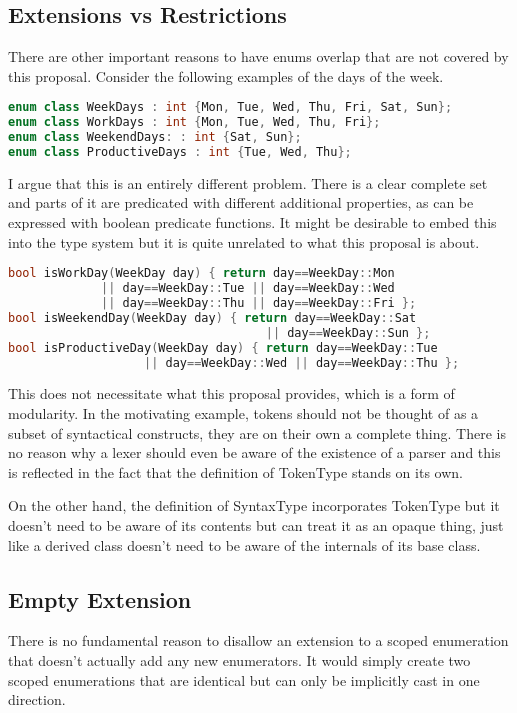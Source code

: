 \documentclass{scrartcl}
\begin{document}
\subsection{Extensions vs Restrictions}
There are other important reasons to have enums overlap that are not covered by this proposal.
Consider the following examples of the days of the week.

\begin{lstlisting}[language=C++]
enum class WeekDays : int {Mon, Tue, Wed, Thu, Fri, Sat, Sun};
enum class WorkDays : int {Mon, Tue, Wed, Thu, Fri};
enum class WeekendDays: : int {Sat, Sun};
enum class ProductiveDays : int {Tue, Wed, Thu};
\end{lstlisting}

\noindent
I argue that this is an entirely different problem.
There is a clear complete set and parts of it are predicated with different additional properties, as can be expressed
with boolean predicate functions.
It might be desirable to embed this into the type system but it is quite unrelated to what this proposal is about.

\begin{lstlisting}[language=C++]
bool isWorkDay(WeekDay day) { return day==WeekDay::Mon
             || day==WeekDay::Tue || day==WeekDay::Wed
             || day==WeekDay::Thu || day==WeekDay::Fri };
bool isWeekendDay(WeekDay day) { return day==WeekDay::Sat
                                    || day==WeekDay::Sun };
bool isProductiveDay(WeekDay day) { return day==WeekDay::Tue
                   || day==WeekDay::Wed || day==WeekDay::Thu };
\end{lstlisting}

\noindent
This does not necessitate what this proposal provides, which is a form of modularity.
In the motivating example, tokens should not be thought of as a subset of syntactical constructs, they are on their own
a complete thing.
There is no reason why a lexer should even be aware of the existence of a parser and this is reflected in the fact that
the definition of TokenType stands on its own.

On the other hand, the definition of SyntaxType incorporates TokenType but it doesn't need to be aware of its contents
but can treat it as an opaque thing, just like a derived class doesn't need to be aware of the internals of its base
class.

\subsection{Empty Extension}
There is no fundamental reason to disallow an extension to a scoped enumeration that doesn't actually add any new enumerators.
It would simply create two scoped enumerations that are identical but can only be implicitly cast in one direction.
\end{document}
